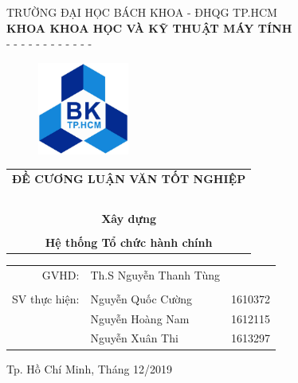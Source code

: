 \documentclass[a4paper]{article}
\begin{document}
\usetikzlibrary{calc}

\begin{titlepage}
\begin{center}
TRƯỜNG ĐẠI HỌC BÁCH KHOA - ĐHQG TP.HCM\\
\textbf{KHOA KHOA HỌC VÀ KỸ THUẬT MÁY TÍNH}\\
- - - - - - - - - - - -
\end{center}

\vspace{0.5cm}
\begin{figure}[H]
\begin{center}
\includegraphics[width=3cm]{img/LogoBK.jpg}
\end{center}
\end{figure}
\vspace{0.5cm}

\begin{center}
\begin{tabular}{c}
\multicolumn{1}{c}{\textbf{{\huge ĐỀ CƯƠNG LUẬN VĂN TỐT NGHIỆP }}}\\
~~\\
\hline
\multicolumn{1}{c}{\textbf{{\Large Xây dựng}}}\\\\
\textbf{{\Large Hệ thống Tổ chức hành chính}}\\
\hline
\end{tabular}
\end{center}

\vspace{1cm}
\begin{table}[H]
\begin{tabular}{rlr}
\hspace{5cm} GVHD: & Th.S Nguyễn Thanh Tùng&\\
\\
\hspace{5cm} SV thực hiện: & Nguyễn Quốc Cường & 1610372\\
& Nguyễn Hoàng Nam & 1612115\\
& Nguyễn Xuân Thi & 1613297\\

\end{tabular}
\end{table}
\vspace{3cm}
\begin{center}
{\footnotesize Tp. Hồ Chí Minh, Tháng 12/2019}
\end{center}
\end{titlepage}
\end{document}
